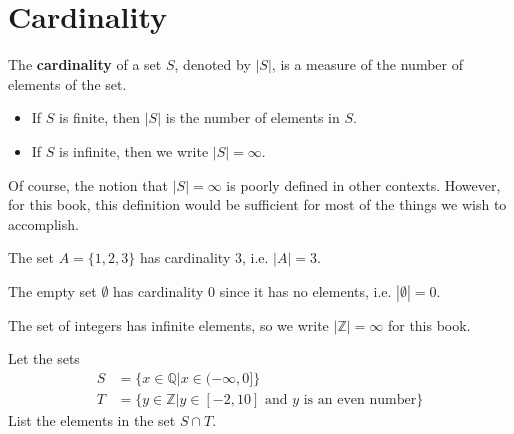 \section{Cardinality}
\begin{definition}
    The \textbf{cardinality} of a set $S$, denoted by $|S|$, is a measure of the number of elements of the set.
    \begin{itemize}
        \item If $S$ is finite, then $|S|$ is the number of elements in $S$.
        \item If $S$ is infinite, then we write $|S| = \infty$.
    \end{itemize}
\end{definition}
\begin{remark}
    Of course, the notion that $|S| = \infty$ is poorly defined in other contexts. However, for this book, this definition would be sufficient for most of the things we wish to accomplish.
\end{remark}
\begin{example}
    The set $A = \{1, 2, 3\}$ has cardinality 3, i.e. $|A| = 3$.
\end{example}
\begin{example}
    The empty set $\emptyset$ has cardinality 0 since it has no elements, i.e. $|\emptyset| = 0$.
\end{example}
\begin{example}
    The set of integers has infinite elements, so we write $|\mathbb{Z}| = \infty$ for this book.
\end{example}

\begin{exercise}
    Let the sets
    \begin{align*}
        S &= \{x \in \mathbb{Q} \vert x \in (-\infty, 0]\}\\
        T &= \{y \in \mathbb{Z} \vert y \in [-2, 10] \text{ and } y \text{ is an even number} \}
    \end{align*}
    List the elements in the set $S \cap T$.
\end{exercise}
